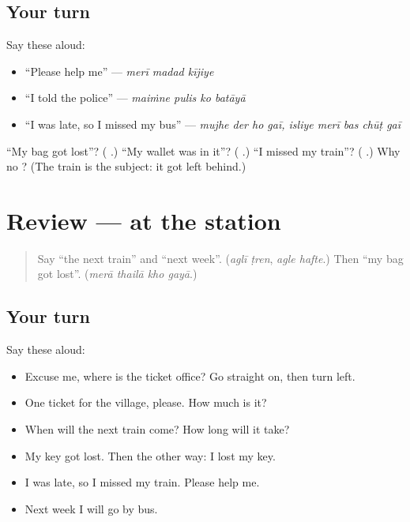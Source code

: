 \subsection*{Your turn}
Say these aloud:

\begin{itemize}
\raggedright
  \item \textquotedblleft{}Please help me\textquotedblright{} — \emph{merī madad kījiye}
  \item \textquotedblleft{}I told the police\textquotedblright{} — \emph{maiṁne pulis ko batāyā}
  \item \textquotedblleft{}I was late, so I missed my bus\textquotedblright{} — \emph{mujhe der ho gaī, isliye merī bas chūṭ gaī}
\end{itemize}

\begin{tcolorbox}[breakable,colback=teal!4,colframe=teal!35!black,title={Before you move on}]
\textquotedblleft{}My bag got lost\textquotedblright{}? (\textbf{   }.) \textquotedblleft{}My wallet was in it\textquotedblright{}? (\textbf{   }.) \textquotedblleft{}I missed my train\textquotedblright{}? (\textbf{   }.) Why no \textbf{}? (The train is the subject: it got left behind.)
\end{tcolorbox}
\section[(review)]{Review — at the station}

\label{lesson:HI-R283-at-the-station}



\begin{quote}
Say \textquotedblleft{}the next train\textquotedblright{} and \textquotedblleft{}next week\textquotedblright{}. (\emph{aglī ṭren}, \emph{agle hafte}.) Then \textquotedblleft{}my bag got lost\textquotedblright{}. (\emph{merā thailā kho gayā}.)
\end{quote}

\subsection*{Your turn}
Say these aloud:

\begin{itemize}
\raggedright
  \item Excuse me, where is the ticket office? Go straight on, then turn left.
  \item One ticket for the village, please. How much is it?
  \item When will the next train come? How long will it take?
  \item My key got lost. Then the other way: I lost my key.
  \item I was late, so I missed my train. Please help me.
  \item Next week I will go by bus.
\end{itemize}

